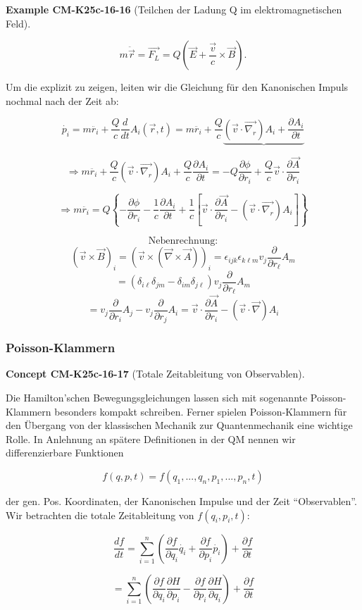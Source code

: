 \documentclass[10pt, letterpaper]{article}
\newcommand{\CustomHeading}[3]{%
  \par\medskip\noindent%
  \textbf{#1 #2} \textnormal{(#3)}.\enskip%
}
\newenvironment{EXA}[2]{\begin{unitbox}\CustomHeading{Example}{#1}{#2}}{\end{unitbox}}
\newenvironment{CONC}[2]{\begin{unitbox}\CustomHeading{Concept}{#1}{#2}}{\end{unitbox}}
\begin{document}
\begin{EXA}{CM-K25c-16-16}{Teilchen der Ladung Q im elektromagnetischen Feld}
\[m\ddot{\vec{r}} = \vec{F_L} = Q\left(\vec{E} + \frac{\vec{v}}{c}\times\vec{B}\right).\]

Um die explizit zu zeigen, leiten wir die Gleichung für den Kanonischen Impuls nochmal nach der Zeit ab:

\[\dot{p_i} = m\ddot{r_i} + \frac{Q}{c}\frac{d}{dt}A_i(\vec{r},t) = m\ddot{r_i} + \frac{Q}{c}\underbrace{(\vec{v}\cdot\vec{\nabla_r})A_i + \frac{\partial A_i}{\partial t}}\]

\[\Rightarrow m\ddot{r_i} + \frac{Q}{c}(\vec{v}\cdot\vec{\nabla_r})A_i + \frac{Q}{c}\frac{\partial A_i}{\partial t} = -Q\frac{\partial \phi}{\partial r_i} + \frac{Q}{c}\vec{v}\cdot\frac{\partial \vec{A}}{\partial r_i}\]

\[\Rightarrow m\ddot{r_i} = Q\left\{-\frac{\partial \phi}{\partial r_i} - \frac{1}{c}\frac{\partial A_i}{\partial t} + \frac{1}{c}\left[\vec{v}\cdot\frac{\partial \vec{A}}{\partial r_i} - (\vec{v}\cdot\vec{\nabla_r})A_i\right]\right\}\]

\[\text{Nebenrechnung:}\]
\[(\vec{v}\times\vec{B})_i = (\vec{v}\times(\vec{\nabla}\times\vec{A}))_i = \epsilon_{ijk}\epsilon_{k\ell m}v_j\frac{\partial}{\partial r_\ell}A_m\]
\[= (\delta_{i\ell}\delta_{jm} - \delta_{im}\delta_{j\ell})v_j\frac{\partial}{\partial r_\ell}A_m\]
\[= v_j\frac{\partial}{\partial r_i}A_j - v_j\frac{\partial}{\partial r_j}A_i = \vec{v}\cdot\frac{\partial \vec{A}}{\partial r_i} - (\vec{v}\cdot\vec{\nabla})A_i\]
\end{EXA}



\pagebreak


\subsubsection*{Poisson-Klammern}

\begin{CONC}{CM-K25c-16-17}{Totale Zeitableitung von Observablen}
Die Hamilton'schen Bewegungsgleichungen lassen sich mit sogenannte Poisson-Klammern besonders kompakt schreiben. Ferner spielen Poisson-Klammern für den Übergang von der klassischen Mechanik zur Quantenmechanik eine wichtige Rolle. In Anlehnung an spätere Definitionen in der QM nennen wir differenzierbare Funktionen

\[f(q,p,t) = f(q_1,...,q_n,p_1,...,p_n,t)\]

der gen. Pos. Koordinaten, der Kanonischen Impulse und der Zeit ``Observablen''. Wir betrachten die totale Zeitableitung von $f(q_i,p_i,t)$:

\[\frac{df}{dt} = \sum_{i=1}^n \left(\frac{\partial f}{\partial q_i}\dot{q_i} + \frac{\partial f}{\partial p_i}\dot{p_i}\right) + \frac{\partial f}{\partial t}\]

\[= \sum_{i=1}^n \left(\frac{\partial f}{\partial q_i}\frac{\partial H}{\partial p_i} - \frac{\partial f}{\partial p_i}\frac{\partial H}{\partial q_i}\right) + \frac{\partial f}{\partial t}\]
\end{CONC}
\end{document}
